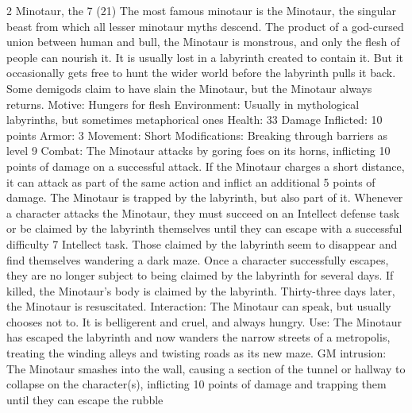 \begin{multicols}{2}
Minotaur, the 7 (21)
The most famous minotaur is the Minotaur, the singular beast from which all lesser minotaur myths descend. The product of a god-cursed union between human and bull,
the Minotaur is monstrous, and only the flesh of people can nourish it. It is usually lost
in a labyrinth created to contain it. But it occasionally gets free to hunt the wider world before the labyrinth pulls it back. Some demigods claim to have slain the Minotaur, but the Minotaur always returns.
Motive: Hungers for flesh
Environment: Usually in mythological labyrinths, but sometimes metaphorical ones Health: 33
Damage Inflicted: 10 points
Armor: 3
Movement: Short
Modifications: Breaking through barriers as level 9
Combat: The Minotaur attacks by goring foes on its horns, inflicting 10 points of damage
on a successful attack. If the Minotaur charges a short distance, it can attack as part of
the same action and inflict an additional 5 points of damage.
The Minotaur is trapped by the labyrinth, but also part of it. Whenever a character attacks
the Minotaur, they must succeed on an Intellect defense task or be claimed by the labyrinth themselves until they can escape with a successful difficulty 7 Intellect task. Those claimed by the labyrinth seem to disappear and find themselves wandering a dark maze. Once a character successfully escapes, they are no longer subject to being claimed by the labyrinth for several days.
If killed, the Minotaur’s body is claimed by the labyrinth. Thirty-three days later, the Minotaur is resuscitated.
Interaction: The Minotaur can speak, but usually chooses not to. It is belligerent and cruel, and always hungry.
Use: The Minotaur has escaped the labyrinth and now wanders the narrow streets of a metropolis, treating the winding alleys and twisting roads as its new maze.
GM intrusion: The Minotaur smashes into the wall, causing a section of the tunnel or hallway to collapse on the character(s), inflicting 10 points of damage and trapping them until they can escape the rubble


\end{multicols}
